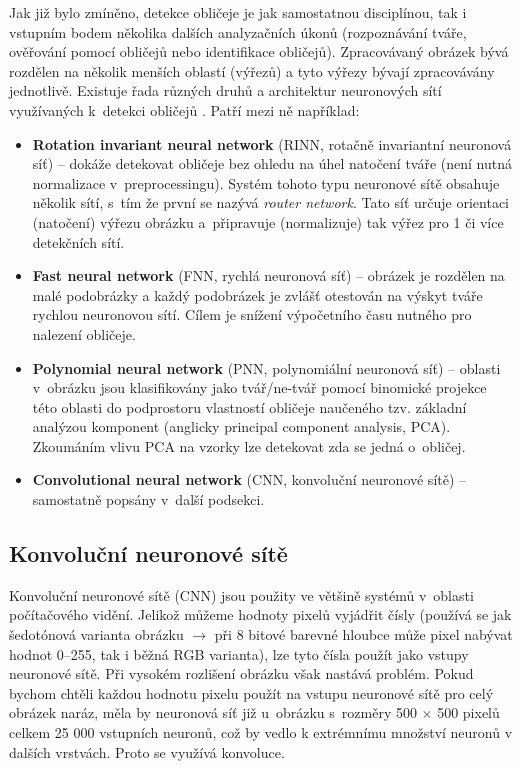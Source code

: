 Jak již bylo zmíněno, detekce obličeje je jak samostatnou disciplínou, tak i vstupním bodem několika dalších analyzačních úkonů (rozpoznávání tváře, ověřování pomocí obličejů nebo identifikace obličejů). Zpracovávaný obrázek bývá rozdělen na několik menších oblastí (výřezů) a tyto výřezy bývají zpracovávány jednotlivě. 
Existuje řada různých druhů a architektur neuronových sítí využívaných k~detekci obličejů \cite{fdReviewNS}. Patří mezi ně například:

\begin{itemize}
  \item \textbf{Rotation invariant neural network} (RINN, rotačně invariantní neuronová síť) -- dokáže detekovat obličeje bez ohledu na úhel natočení tváře (není nutná normalizace v~preprocessingu). Systém tohoto typu neuronové sítě obsahuje několik sítí, s~tím že první se nazývá \emph{router network}. Tato síť určuje orientaci (natočení) výřezu obrázku a~připravuje (normalizuje) tak výřez pro 1 či více detekčních sítí.
  \item \textbf{Fast neural network} (FNN, rychlá neuronová síť) -- obrázek je rozdělen na malé podobrázky a každý podobrázek je zvlášť otestován na výskyt tváře rychlou neuronovou sítí. Cílem je snížení výpočetního času nutného pro nalezení obličeje.
  \item \textbf{Polynomial neural network} (PNN, polynomiální neuronová síť) -- oblasti v~obrázku jsou klasifikovány jako tvář/ne-tvář pomocí binomické projekce této oblasti do podprostoru vlastností obličeje naučeného tzv. základní analýzou komponent (anglicky principal component analysis, PCA). Zkoumáním vlivu PCA na vzorky lze detekovat zda se jedná o~obličej.
  \item \textbf{Convolutional neural network} (CNN, konvoluční neuronové sítě) -- samostatně popsány v~další podsekci. 
\end{itemize}


\subsection*{Konvoluční neuronové sítě}
Konvoluční neuronové sítě (CNN) \cite{cnnNlp, cnnCv, cnnIntro} jsou použity ve většině systémů v~oblasti počítačového vidění. Jelikož můžeme hodnoty pixelů vyjádřit čísly (používá se jak šedotónová varianta obrázku $\rightarrow$ při 8 bitové barevné hloubce může pixel nabývat hodnot 0--255, tak i běžná RGB varianta), lze tyto čísla použít jako vstupy neuronové sítě. Při vysokém rozlišení obrázku však nastává problém. Pokud bychom chtěli každou hodnotu pixelu použít na vstupu neuronové sítě pro celý obrázek naráz, měla by neuronová síť již u~obrázku s~rozměry 500 $\times$ 500 pixelů celkem 25 000 vstupních neuronů, což by vedlo k extrémnímu množství neuronů v dalších vrstvách. Proto se využívá konvoluce.

